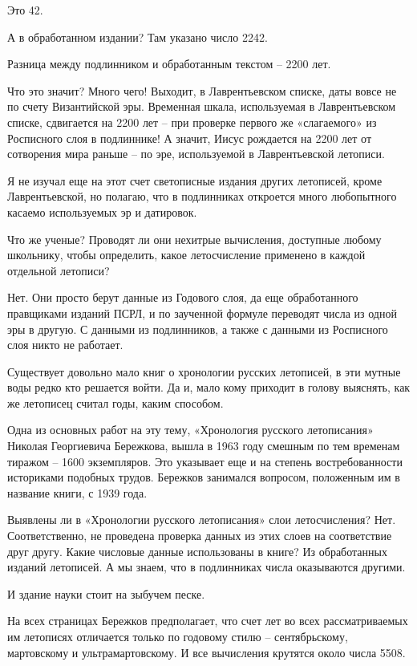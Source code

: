 Это 42.

А в обработанном издании? Там указано число 2242.

Разница между подлинником и обработанным текстом – 2200 лет.

Что это значит? Много чего! Выходит, в Лаврентьевском списке, даты вовсе не по счету Византийской эры. Временная шкала, используемая в Лаврентьевском списке, сдвигается на 2200 лет – при проверке первого же «слагаемого» из Росписного слоя в подлиннике! А значит, Иисус рождается на 2200 лет от сотворения мира раньше – по эре, используемой в Лаврентьевской летописи.

Я не изучал еще на этот счет светописные издания других летописей, кроме Лаврентьевской, но полагаю, что в подлинниках откроется много любопытного касаемо используемых эр и датировок.

Что же ученые? Проводят ли они нехитрые вычисления, доступные любому школьнику, чтобы определить, какое летосчисление применено в каждой отдельной летописи?

Нет. Они просто берут данные из Годового слоя, да еще обработанного правщиками изданий ПСРЛ, и по заученной формуле переводят числа из одной эры в другую. С данными из подлинников, а также с данными из Росписного слоя никто не работает.

Существует довольно мало книг о хронологии русских летописей, в эти мутные воды редко кто решается войти. Да и, мало кому приходит в голову выяснять, как же летописец считал годы, каким способом.

Одна из основных работ на эту тему, «Хронология русского летописания» Николая Георгиевича Бережкова, вышла в 1963 году смешным по тем временам тиражом – 1600 экземпляров. Это указывает еще и на степень востребованности историками подобных трудов. Бережков занимался вопросом, положенным им в название книги, с 1939 года.

Выявлены ли в «Хронологии русского летописания» слои летосчисления? Нет. Соответственно, не проведена проверка данных из этих слоев на соответствие друг другу. Какие числовые данные использованы в книге? Из обработанных изданий летописей. А мы знаем, что в подлинниках числа оказываются другими.

И здание науки стоит на зыбучем песке.

На всех страницах Бережков предполагает, что счет лет во всех рассматриваемых им летописях отличается только по годовому стилю – сентябрьскому, мартовскому и ультрамартовскому. И все вычисления крутятся около числа 5508.

